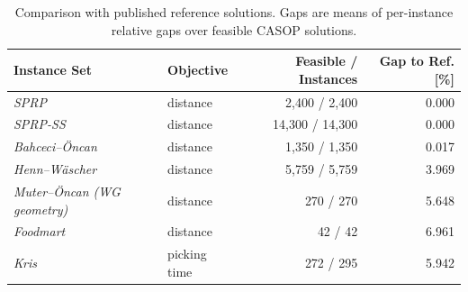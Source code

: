 \begin{table}[tbp]
\centering
\caption{Comparison with published reference solutions. Gaps are means of per-instance relative gaps over feasible CASOP solutions.}
\label{tab:validation}
\small
\setlength{\tabcolsep}{4pt}
\begin{tabular}{@{}llrr@{}}
\toprule
Instance Set & Objective & Feasible / Instances & Gap to Ref. [\%] \\
\midrule
\textit{SPRP} & distance & 2,400 / 2,400 & 0.000 \\
\textit{SPRP-SS} & distance & 14,300 / 14,300 & 0.000 \\
\textit{Bahceci--Öncan} & distance & 1,350 / 1,350 & 0.017 \\
\textit{Henn--Wäscher} & distance & 5,759 / 5,759 & 3.969 \\
\textit{Muter--Öncan (WG geometry)} & distance & 270 / 270 & 5.648 \\
\textit{Foodmart} & distance & 42 / 42 & 6.961 \\
\textit{Kris} & picking time & 272 / 295 & 5.942 \\
\bottomrule
\end{tabular}
\end{table}
